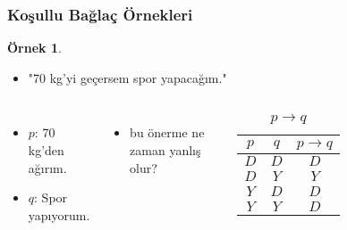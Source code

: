 \documentclass[dvipsnames]{beamer}
\theoremstyle{definition}
\theoremstyle{example}
\newtheorem{ornek}[theorem]{Örnek}
\theoremstyle{plain}
\begin{document}
\begin{frame}
  \frametitle{Koşullu Bağlaç Örnekleri}

  \begin{ornek}
    \begin{itemize}
      \item "70 kg'yi geçersem spor yapacağım."
    \end{itemize}

    \pause
    \begin{columns}
      \begin{itemize}
        \item $p$: 70 kg'den ağırım.
        \item $q$: Spor yapıyorum.
      \end{itemize}

      \pause
      \begin{itemize}
        \item bu önerme ne zaman yanlış olur?
      \end{itemize}

      \begin{table}
        \caption{$p \rightarrow q$}
        \begin{tabular}{|c|c||c|}\hline
          $p$ & $q$ & $p \rightarrow q$\\\hline\hline
          $D$ & $D$ & $D$\\\hline
          $D$ & $Y$ & $Y$\\\hline
          $Y$ & $D$ & $D$\\\hline
          $Y$ & $Y$ & $D$\\\hline
        \end{tabular}
      \end{table}
    \end{columns}
  \end{ornek}
\end{frame}
\end{document}

